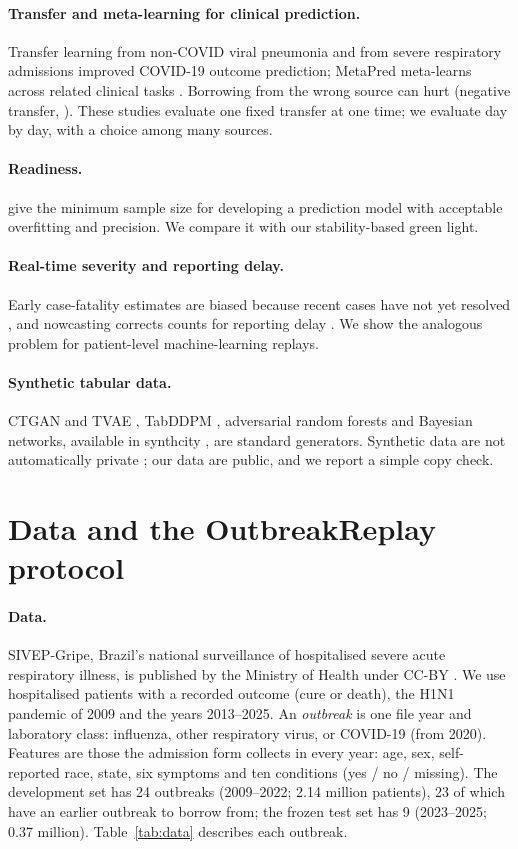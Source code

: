 \documentclass[10pt]{article}
\begin{document}
\paragraph{Transfer and meta-learning for clinical prediction.} Transfer learning \citep{pan2010transfer} from
non-COVID viral pneumonia \citep{lichtner2021covid} and from severe respiratory admissions
\citep{agarwal2022transmed} improved COVID-19 outcome prediction; MetaPred meta-learns across related clinical
tasks \citep{zhang2019metapred}. Borrowing from the wrong source can hurt (negative transfer,
\citealp{wang2019negative}). These studies evaluate one fixed transfer at one time; we evaluate day by day, with a
choice among many sources.
\paragraph{Readiness.} \citet{riley2020samplesize} give the minimum sample size for developing a prediction model
with acceptable overfitting and precision. We compare it with our stability-based green light.
\paragraph{Real-time severity and reporting delay.} Early case-fatality estimates are biased because recent cases
have not yet resolved \citep{nishiura2009cfr}, and nowcasting corrects counts for reporting delay
\citep{hohle2014nowcasting}. We show the analogous problem for patient-level machine-learning replays.
\paragraph{Synthetic tabular data.} CTGAN and TVAE \citep{xu2019ctgan}, TabDDPM \citep{kotelnikov2023tabddpm},
adversarial random forests \citep{watson2023arf} and Bayesian networks, available in synthcity
\citep{qian2023synthcity}, are standard generators. Synthetic data are not automatically private
\citep{stadler2022groundhog}; our data are public, and we report a simple copy check.

\section{Data and the OutbreakReplay protocol}\label{sec:setup}
\paragraph{Data.} SIVEP-Gripe, Brazil's national surveillance of hospitalised severe acute respiratory illness, is
published by the Ministry of Health under CC-BY \citep{srag_data}. We use hospitalised patients with a recorded
outcome (cure or death), the H1N1 pandemic of 2009 and the years 2013--2025. An \emph{outbreak} is one file year and
laboratory class: influenza, other respiratory virus, or COVID-19 (from 2020). Features are those the admission form
collects in every year: age, sex, self-reported race, state, six symptoms and ten conditions (yes / no / missing).
The development set has 24 outbreaks (2009--2022; 2.14 million patients), 23 of which have an earlier outbreak to
borrow from; the frozen test set has 9 (2023--2025; 0.37 million). Table~\ref{tab:data} describes each outbreak.
\end{document}
